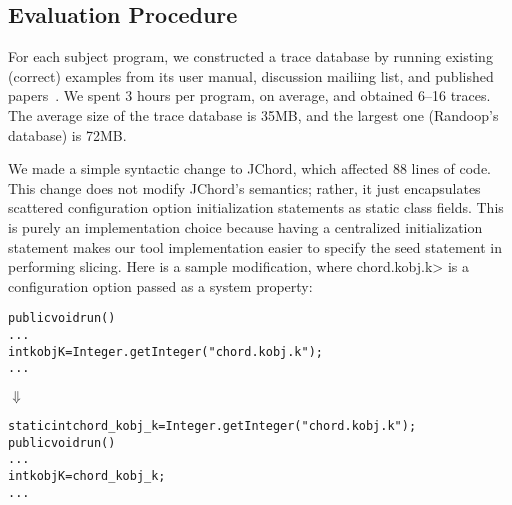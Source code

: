 \subsection{Evaluation Procedure}

For each subject program, we constructed a trace database
by running existing (correct) examples from its user manual, discussion
mailiing list, and published papers~\cite{PachecoLET2007, Beschastnikh:2011, Rabkin:2011:PPC}.
We spent 3 hours per program, on average, and obtained 6--16 traces.
The average size of the trace database is 35MB, and the largest one (Randoop's
database) is 72MB.



We made a simple syntactic change to JChord, which affected 88
lines of code. This change
does not modify JChord's semantics; rather, it just encapsulates
scattered configuration option initialization statements 
as static class fields. This is purely an implementation
choice because having a centralized initialization statement
makes our tool implementation easier to specify the seed statement
in performing slicing. Here is a sample modification, where 
\<chord.kobj.k> 
is a configuration option
passed as a system property:


\begin{CodeOut}
\begin{alltt}
public void run() \ttlcb
  ...
  int kobjK = Integer.getInteger("chord.kobj.k");
  ...
\ttrcb
\end{alltt}
\end{CodeOut}
\vspace{-4mm}
\hspace{20mm}$\Downarrow$ 
\begin{CodeOut}
\begin{alltt}
static int chord\_kobj\_k = Integer.getInteger("chord.kobj.k");
public void run() \ttlcb
  ...
  int kobjK = chord\_kobj\_k; 
  ...
\ttrcb
\end{alltt}
\end{CodeOut}





